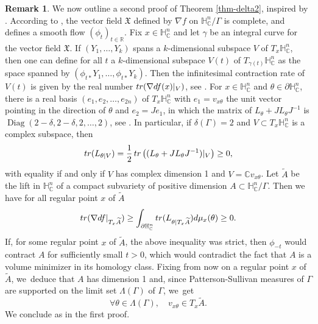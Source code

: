 \documentclass[11pt]{article}
\theoremstyle{definition}
\newtheorem*{remark}{Remark}
\newcommand{\C}{\mathbb{C}}
\newcommand{\R}{\mathbb{R}}
\newcommand{\HNC}{\mathbb{H}^{n}_{\C}}
\newcommand{\PHNC}{\partial\mathbb{H}^{n}_{\C}}
\DeclareMathOperator{\Diag}{Diag}
\newcommand{\tr}{\textup{tr}}
\def\C{\mathbb{C}}
\newcommand{\HNC}{\mathbb{H}^{n}_{\C}}
\begin{document}
\begin{remark}
We now outline a second proof of Theorem \ref{thm-delta2}, inspired by \cite[Th.\,1.5]{connellNaturalFlowCritical2023}. According to \cite[Lem.\,2.2]{connellNaturalFlowCritical2023}, the vector field $\mathfrak{X}$ defined by $\nabla{f}$ on $\HNC/\Gamma$ is complete, and defines a smooth flow $(\phi_t)_{t\in \R}$. Fix $x\in \HNC$ and let $\gamma$ be an integral curve for the vector field $\mathfrak{X}$. If $(Y_1,\dots,Y_k)$ spans a $k$-dimensional subspace $V$ of $T_x\HNC$, then one can define for all $t$ a $k$-dimensional subspace $V(t)$ of $T_{\gamma(t)}\HNC$ as the space spanned by $(\phi_{t\ast}Y_1,\dots,\phi_{t\ast}Y_k)$. Then the infinitesimal contraction rate of $V(t)$ is given by the real number $\tr(\nabla d{f}(x)\vert_{ V})$, see \cite[Lem.\,2.5]{connellNaturalFlowCritical2023}. For $x\in \HNC$ and $\theta\in \PHNC$, there is a real basis $(e_1,e_2,\dots,e_{2n})$ of $T_{x}\HNC$ with $e_1=v_{x\theta}$ the unit vector pointing in the direction of $\theta$ and $e_2=Je_1$, in which the matrix of $L_{\theta} + JL_{\theta}J^{-1}$ is
$\Diag(2-\delta,2-\delta,2,\dots,2)$, see \cite[Proof of Lem.\,2.6]{connellNaturalFlowCritical2023}.
In particular, if $\delta(\Gamma)=2$ and $V\subset T_x\HNC$ is a complex subspace, then
\begin{equation*}
\tr(L_{\theta\vert V}) = \frac{1}{2}\,\tr\left((L_{\theta} + JL_{\theta}J^{-1})\vert_{ V}\right) \ge 0,
\end{equation*}
with equality if and only if $V$ has complex dimension 1 and $V=\C v_{x\theta}$.
Let $\widetilde{A}$ be the lift in $\HNC$ of a compact subvariety of positive dimension $A\subset\HNC/\Gamma$. Then we have for all regular point $x$ of $\widetilde{A}$
\begin{equation*}
\tr(\nabla d{f}\vert_{ T_x\widetilde{A}}) \ge \int_{\PHNC}\tr(L_{\theta\vert T_x\widetilde{A}})d\mu_x(\theta) \ge 0.
\end{equation*}
If, for some regular point $x$ of $\widetilde{A}$, the above inequality was strict, then $\phi_{-t}$ would contract $A$ for sufficiently small $t>0$, which would contradict the fact that $A$ is a volume minimizer in its homology class. Fixing from now on a regular point $x$ of $\widetilde{A}$, we~deduce that $A$ has dimension 1 and, since Patterson-Sullivan measures of $\Gamma$ are supported on the limit set $\Lambda(\Gamma)$ of $\Gamma$, we~get
\begin{equation*}
\forall \theta \in \Lambda(\Gamma),\quad v_{x\theta} \in T_x\widetilde{A}.
\end{equation*}
We conclude as in the first proof.
\end{remark}
\end{document}
